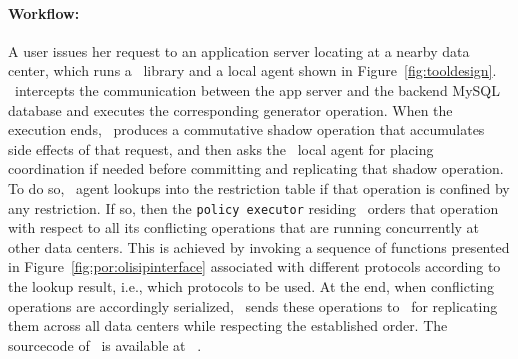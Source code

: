 \noindent\paragraph{Workflow:} A user issues her request to an application server locating at a nearby
data center, which runs a \tool\ library and
a local agent shown in Figure~\ref{fig:tooldesign}. \tool\ intercepts the communication between
the app server and the backend MySQL database and executes the corresponding generator operation.
When the execution ends, \tool\ produces a commutative shadow operation that accumulates side effects
of that request, and then asks the \coordtool\ local agent for placing coordination if needed before committing and replicating
that shadow operation. To do so, \coordtool\ agent lookups into the restriction table
if that operation is confined by any restriction. If so, then the {\tt policy executor} residing
\coordtool\ orders that operation with respect to all its conflicting operations that are running concurrently
at other data centers. This is achieved by invoking a sequence of functions 
presented in Figure~\ref{fig:por:olisipinterface} associated with different protocols 
according to the lookup result, i.e., which protocols to be used. 
At the end, when conflicting operations are accordingly serialized, \tool\ sends these
operations to \gemini\ for replicating them across all data centers while respecting the established order. 
The sourcecode of \coordtool\ is available at ~\cite{olisipocode}.
